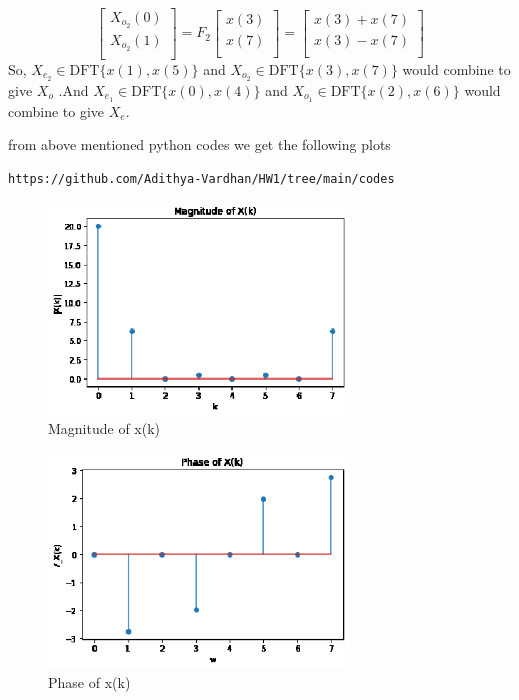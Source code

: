 \documentclass[journal,12pt,twocolumn]{IEEEtran}
\begin{document}
\begin{equation}
\begin{bmatrix}
X_{o_{2}}(0) \\ 
X_{o_{2}}(1)\\ 
\end{bmatrix}
= F_{2}
\begin{bmatrix}
x(3) \\ 
x(7) \\ 
\end{bmatrix}
=
\begin{bmatrix}
x(3)+x(7) \\ 
x(3)-x(7) \\ 
\end{bmatrix}
\end{equation}
So, $X_{e_{2}} \in \text{DFT} \{x(1),x(5)\}$ and $X_{o_{2}} \in \text{DFT} \{x(3),x(7)\}$ would combine to give $X_{o}$ .And $X_{e_{1}} \in \text{DFT} \{x(0),x(4)\}$ and $X_{o_{1}} \in \text{DFT} \{x(2),x(6)\}$ would combine to give $X_{e}$.

from above mentioned python codes we get  the following plots\\
\begin{lstlisting}
https://github.com/Adithya-Vardhan/HW1/tree/main/codes
\end{lstlisting}

\begin{figure}[h!]
    \centering
    \includegraphics[width=8cm]{./figures/abs_x(k)_2.eps}
    \caption{Magnitude of x(k)}
    \label{|h(k)|}
\end{figure} 
\begin{figure}[h!]
    \centering
    \includegraphics[width=8cm]{./figures/phase_x(k)_2.eps}
    \caption{Phase of x(k)}
    \label{/_X(k)}
\end{figure} 
\end{document}
